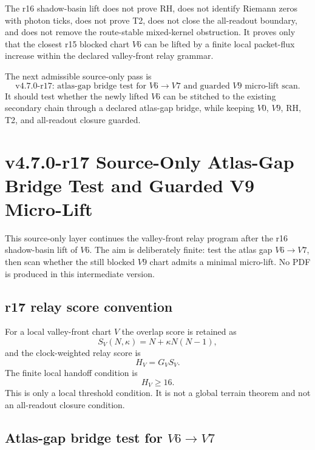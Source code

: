 \begin{remark}
The r16 shadow-basin lift does not prove RH, does not identify Riemann zeros
with photon ticks, does not prove T2, does not close the all-readout boundary,
and does not remove the route-stable mixed-kernel obstruction.  It proves only
that the closest r15 blocked chart \(V6\) can be lifted by a finite local
packet-flux increase within the declared valley-front relay grammar.
\end{remark}

\begin{corollary}
\label{cor:v470-r16-permitted-r17-direction}
The next admissible source-only pass is
\[
\text{v4.7.0-r17: atlas-gap bridge test for }V6\to V7
\text{ and guarded }V9\text{ micro-lift scan.}
\]
It should test whether the newly lifted \(V6\) can be stitched to the existing
secondary chain through a declared atlas-gap bridge, while keeping \(V0\),
\(V9\), RH, T2, and all-readout closure guarded.
\end{corollary}



\section{v4.7.0-r17 Source-Only Atlas-Gap Bridge Test and Guarded V9 Micro-Lift}
\label{sec:v470-r17-atlas-gap-bridge-v9-microlift}

This source-only layer continues the valley-front relay program after the r16
shadow-basin lift of \(V6\).  The aim is deliberately finite: test the atlas gap
\(V6\to V7\), then scan whether the still blocked \(V9\) chart admits a minimal
micro-lift.  No PDF is produced in this intermediate version.

\subsection{r17 relay score convention}
\label{subsec:v470-r17-relay-score-convention}

For a local valley-front chart \(V\) the overlap score is retained as
\[
S_V(N,\kappa)=N+\kappa N(N-1),
\]
and the clock-weighted relay score is
\[
H_V=G_VS_V.
\]
The finite local handoff condition is
\[
H_V\geq 16.
\]
This is only a local threshold condition.  It is not a global terrain theorem
and not an all-readout closure condition.

\subsection{Atlas-gap bridge test for \texorpdfstring{\(V6\to V7\)}{V6 to V7}}
\label{subsec:v470-r17-v6-v7-bridge-test}

